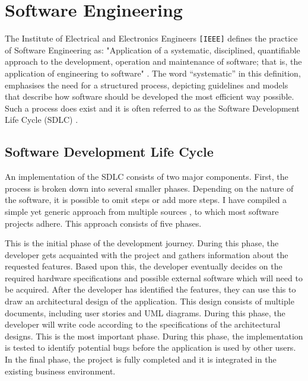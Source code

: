 \chapter{Software Engineering}
The Institute of Electrical and Electronics Engineers \texttt{[IEEE]} defines the practice of Software Engineering as: "Application of a systematic, disciplined, quantifiable approach to the development, operation and maintenance of software; that is, the application of engineering to software" \cite[p.~421]{8016712}. The word ``systematic'' in this definition, emphasises the need for a structured process, depicting guidelines and models that describe how software should be developed the most efficient way possible. Such a process does exist and it is often referred to as the Software Development Life Cycle (SDLC) \cite[p.~420]{8016712}. 

\section{Software Development Life Cycle}
An implementation of the SDLC consists of two major components. First, the process is broken down into several smaller phases. Depending on the nature of the software, it is possible to omit steps or add more steps. I have compiled a simple yet generic approach from multiple sources \cite{2010govardhan}, to which most software projects adhere. This approach consists of five phases.
\begin{enumerate}
	 This is the initial phase of the development journey. During this phase, the developer gets acquainted with the project and gathers information about the requested features. Based upon this, the developer eventually decides on the required hardware specifications and possible external software which will need to be acquired.
	 After the developer has identified the features, they can use this to draw an architectural design of the application. This design consists of multiple documents, including user stories and UML diagrams.
	 During this phase, the developer will write code according to the specifications of the architectural designs.
	 This is the most important phase. During this phase, the implementation is tested to identify potential bugs before the application is used by other users.
	 In the final phase, the project is fully completed and it is integrated in the existing business environment.
\end{enumerate}

